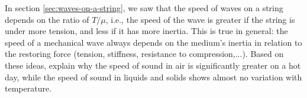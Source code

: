 In section \ref{sec:waves-on-a-string}, we saw that the speed of waves on a
string depends on the ratio of $T/\mu $, i.e., the speed of
the wave is greater if the string is under more tension, and
less if it has more inertia. This is true in general: the
speed of a mechanical wave always depends on the medium's
inertia in relation to the restoring force (tension,
stiffness, resistance to compression,...). Based on these
ideas, explain why the speed of sound in air is significantly greater on a hot day,
while the speed of sound in
liquids and solids shows almost no variation with temperature.
